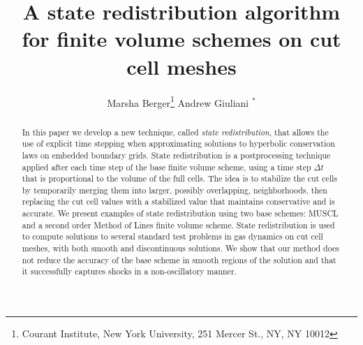 \documentclass[12pt]{article}
\begin{document}
\date{}

\title{A state redistribution algorithm for finite volume schemes
on cut cell meshes}
\author{Marsha Berger\footnote{Courant Institute, New York University, 251 Mercer St.,
NY, NY 10012}  \hspace{1in} Andrew Giuliani $^*$}

\maketitle

\begin{abstract}
In this paper we develop a new technique, called \textit{state redistribution}, 
that allows the use of explicit time stepping when approximating
solutions to hyperbolic conservation laws on embedded boundary grids.  
State redistribution is a postprocessing technique applied after each time 
step of the base finite volume scheme, using a time step $\Delta t$ 
that is proportional to the volume of the full cells.  The idea is to 
stabilize the cut cells by temporarily merging them into larger, 
possibly overlapping, neighborhoods, 
then replacing the cut cell values with a stabilized value
that maintains conservative and is accurate.
We present examples of state redistribution using two base schemes:
MUSCL and a second order Method of Lines finite volume scheme. 
State redistribution is used to compute solutions to several 
standard test problems in gas dynamics on cut cell meshes, with both
smooth and discontinuous solutions. We show that our method does not 
reduce the accuracy of the base scheme in smooth regions of the solution and 
that it successfully captures shocks in a non-oscillatory manner.
\end{abstract}







%




\newpage
\small


\end{document}
